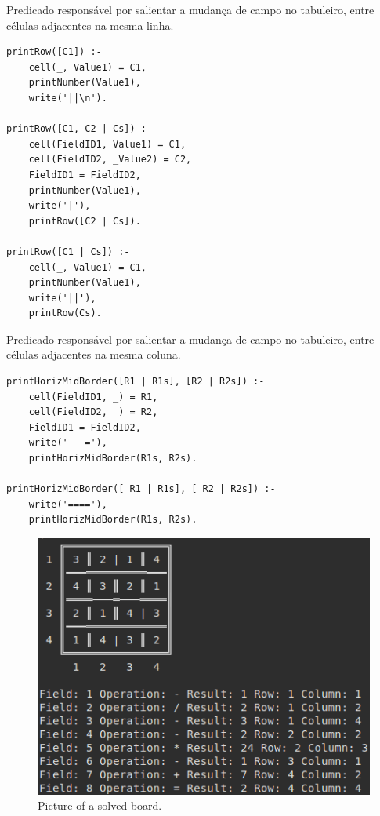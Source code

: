 \documentclass[runningheads,a4paper]{llncs}
\begin{document}
Predicado responsável por salientar a mudança de campo no tabuleiro, entre células adjacentes na mesma linha.
\begin{verbatim}
printRow([C1]) :- 
	cell(_, Value1) = C1,  
	printNumber(Value1),
	write('||\n').

printRow([C1, C2 | Cs]) :- 
	cell(FieldID1, Value1) = C1, 
	cell(FieldID2, _Value2) = C2, 
	FieldID1 = FieldID2, 
	printNumber(Value1),
	write('|'), 
	printRow([C2 | Cs]).

printRow([C1 | Cs]) :- 
	cell(_, Value1) = C1,
	printNumber(Value1),
	write('||'), 
	printRow(Cs).
\end{verbatim}

Predicado responsável por salientar a mudança de campo no tabuleiro, entre células adjacentes na mesma coluna.
\begin{verbatim}
printHorizMidBorder([R1 | R1s], [R2 | R2s]) :- 
	cell(FieldID1, _) = R1, 
	cell(FieldID2, _) = R2, 
	FieldID1 = FieldID2, 
	write('---='), 
	printHorizMidBorder(R1s, R2s). 

printHorizMidBorder([_R1 | R1s], [_R2 | R2s]) :- 
	write('===='), 
	printHorizMidBorder(R1s, R2s).
\end{verbatim}

\begin{figure}
\centering
\includegraphics[scale=0.5]{solve}
\caption{Picture of a solved board.}
\label{fig:example}
\end{figure}

\FloatBarrier
\end{document}
